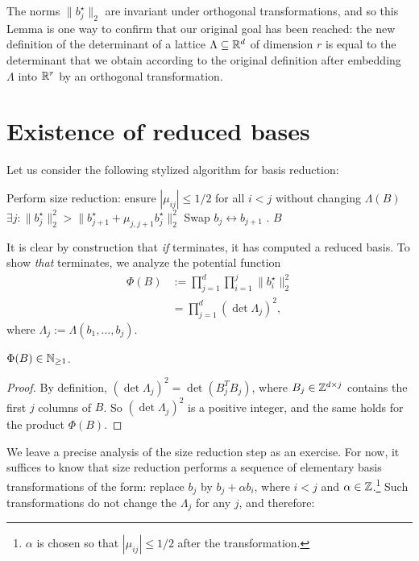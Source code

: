 The norms $\|b_j^\star\|_2$ are invariant under orthogonal transformations,
and so this Lemma is one way to confirm that our original goal has been reached:
the new definition of the determinant of a lattice $\Lambda \subseteq \mathbb{R}^d$ of dimension $r$
is equal to the determinant that we obtain according to the original definition
after embedding $\Lambda$ into $\mathbb{R}^r$ by an orthogonal transformation.




\section{Existence of reduced bases}

Let us consider the following stylized algorithm for basis reduction:
\begin{codebox}
  \li Perform size reduction: ensure $|\mu_{ij}| \leq 1/2$ for all $i < j$ without changing $\Lambda(B)$
  \li \If $\exists j: \|b_j^\star\|_2^2 > \|b_{j+1}^\star + \mu_{j,j+1} b_j^\star\|_2^2$
  \li \Then Swap $b_j \leftrightarrow b_{j+1}$
  \li       {}.
      \End
  \li \Return $B$
\end{codebox}
It is clear by construction that \emph{if}  terminates,
it has computed a reduced basis.
To show \emph{that}  terminates,
we analyze the potential function
\begin{align*}
  \Phi(B) &:= \prod_{j=1}^d \prod_{i=1}^j \|b_i^\star\|_2^2 \\
          &= \prod_{j=1}^d (\det \Lambda_j)^2,
\end{align*}
where $\Lambda_j := \Lambda(b_1,\ldots,b_j)$.
\begin{lemma}
  $\Phi(B) \in \mathbb{N}_{\geq 1}$.
\end{lemma}
\begin{proof}
  By definition, $(\det\Lambda_j)^2 = \det(B_j^T B_j)$,
  where $B_j \in \mathbb{Z}^{d \times j}$ contains the first $j$ columns of $B$.
  So $(\det\Lambda_j)^2$ is a positive integer, and the same holds for the product $\Phi(B)$.
\end{proof}

We leave a precise analysis of the size reduction step as an exercise.
For now, it suffices to know that size reduction performs a sequence
of elementary basis transformations of the form: replace $b_j$ by $b_j + \alpha b_i$,
where $i < j$ and $\alpha \in \mathbb{Z}$.\footnote{$\alpha$ is chosen so that $|\mu_{ij}| \leq 1/2$ after the transformation.}
Such transformations do not change the $\Lambda_j$ for any $j$, and therefore:

